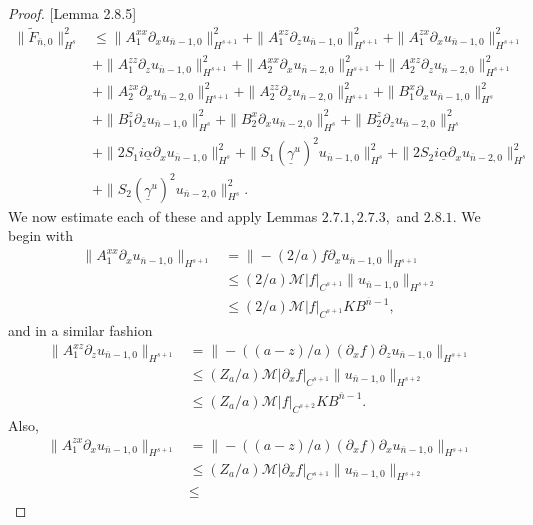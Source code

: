 \begin{proof}{[Lemma 2.8.5]}
\begin{align*}
\|\tilde{F}_{\overline{n},0}\|_{H^{s}}^2&\le \|A_1^{xx}\partial_x u_{\overline{n}-1,0}\|_{H^{s+1}}^2 + \|A_1^{xz}\partial_z u_{\overline{n}-1,0}\|_{H^{s+1}}^2 + \|A_1^{zx}\partial_x u_{\overline{n}-1,0}\|_{H^{s+1}}^2 \\&+
\|A_1^{zz}\partial_z u_{\overline{n}-1,0}\|_{H^{s+1}}^2 + \|A_2^{xx}\partial_x u_{\overline{n}-2,0}\|_{H^{s+1}}^2 + \|A_2^{xz}\partial_z u_{\overline{n}-2,0}\|_{H^{s+1}}^2 \\&+
\|A_2^{zx}\partial_x u_{\overline{n}-2,0}\|_{H^{s+1}}^2 + \|A_2^{zz}\partial_z u_{\overline{n}-2,0}\|_{H^{s+1}}^2 + \|B_1^{x}\partial_x u_{\overline{n}-1,0}\|_{H^{s}}^2 \\&+
\|B_1^{z}\partial_z u_{\overline{n}-1,0}\|_{H^{s}}^2 +
\|B_2^{x}\partial_x u_{\overline{n}-2,0}\|_{H^{s}}^2 +
\|B_2^{z}\partial_z u_{\overline{n}-2,0}\|_{H^{s}}^2 \\&+
\|2S_1i\underline{\alpha}\partial_xu_{\overline{n}-1,0}\|_{H^{s}}^2 + \|S_1(\underline{\gamma}^u)^2u_{\overline{n}-1,0}\|_{H^{s}}^2+\|2S_2i\underline{\alpha}\partial_xu_{\overline{n}-2,0}\|_{H^{s}}^2\\&+
\|S_2(\underline{\gamma}^u)^2u_{\overline{n}-2,0}\|_{H^{s}}^2.
\end{align*}
We now estimate each of these and apply Lemmas $2.7.1, 2.7.3,$ and $2.8.1$. We begin with
\begin{align*}
\|A_1^{xx}\partial_x u_{\overline{n}-1,0}\|_{H^{s+1}} &= 
\|-(2/a)f\partial_xu_{\overline{n}-1,0}\|_{H^{s+1}}\\&\le
(2/a)\mathcal{M}|f|_{C^{s+1}}\|u_{\overline{n}-1,0}\|_{H^{s+2}}\\&\le
(2/a)\mathcal{M}|f|_{C^{s+1}}KB^{\overline{n}-1},
\end{align*}
and in a similar fashion
\begin{align*}
\|A_1^{xz}\partial_z u_{\overline{n}-1,0}\|_{H^{s+1}} &= 
\|-((a-z)/a)(\partial_x f)\partial_z u_{\overline{n}-1,0}\|_{H^{s+1}}\\&\le
(Z_a/a)\mathcal{M}|\partial_x f|_{C^{s+1}}\|u_{\overline{n}-1, 0}\|_{H^{s+2}} \\&\le
(Z_a/a)\mathcal{M}|f|_{C^{s+2}}KB^{\overline{n}-1}.
\end{align*}
Also,
\begin{align*}
\|A_1^{zx}\partial_x u_{\overline{n}-1,0}\|_{H^{s+1}} &= 
\|-((a-z)/a)(\partial_x f)\partial_x u_{\overline{n}-1,0}\|_{H^{s+1}}\\&\le
(Z_a/a)\mathcal{M}|\partial_x f|_{C^{s+1}}\|u_{\overline{n}-1, 0}\|_{H^{s+2}} \\&\le

\end{align*}
\end{proof}
